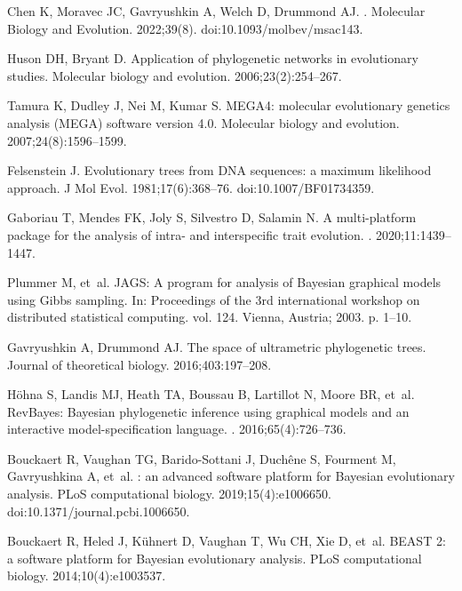 \documentclass[10pt,letterpaper,table]{article}
\theoremstyle{definition}
\begin{document}
\begin{thebibliography}{10}
Chen K, Moravec JC, Gavryushkin A, Welch D, Drummond AJ.
.
\newblock Molecular Biology and Evolution. 2022;39(8).
\newblock doi:{10.1093/molbev/msac143}.

Huson DH, Bryant D.
\newblock Application of phylogenetic networks in evolutionary studies.
\newblock Molecular biology and evolution. 2006;23(2):254--267.

Tamura K, Dudley J, Nei M, Kumar S.
\newblock MEGA4: molecular evolutionary genetics analysis (MEGA) software
  version 4.0.
\newblock Molecular biology and evolution. 2007;24(8):1596--1599.

Felsenstein J.
\newblock Evolutionary trees from DNA sequences: a maximum likelihood approach.
\newblock J Mol Evol. 1981;17(6):368--76.
\newblock doi:{10.1007/BF01734359}.

Gaboriau T, Mendes FK, Joly S, Silvestro D, Salamin N.
\newblock A multi-platform package for the analysis of intra- and interspecific
  trait evolution.
. 2020;11:1439--1447.

Plummer M, et~al.
\newblock JAGS: A program for analysis of Bayesian graphical models using Gibbs
  sampling.
\newblock In: Proceedings of the 3rd international workshop on distributed
  statistical computing. vol. 124. Vienna, Austria; 2003. p. 1--10.

Gavryushkin A, Drummond AJ.
\newblock The space of ultrametric phylogenetic trees.
\newblock Journal of theoretical biology. 2016;403:197--208.

H{\"o}hna S, Landis MJ, Heath TA, Boussau B, Lartillot N, Moore BR, et~al.
\newblock RevBayes: Bayesian phylogenetic inference using graphical models and
  an interactive model-specification language.
. 2016;65(4):726--736.

Bouckaert R, Vaughan TG, Barido-Sottani J, Duch{\^e}ne S, Fourment M,
  Gavryushkina A, et~al.
: an advanced software platform for {B}ayesian
  evolutionary analysis.
\newblock PLoS computational biology. 2019;15(4):e1006650.
\newblock doi:{10.1371/journal.pcbi.1006650}.

Bouckaert R, Heled J, K{\"u}hnert D, Vaughan T, Wu CH, Xie D, et~al.
\newblock BEAST 2: a software platform for Bayesian evolutionary analysis.
\newblock PLoS computational biology. 2014;10(4):e1003537.


\end{thebibliography}
\end{document}
